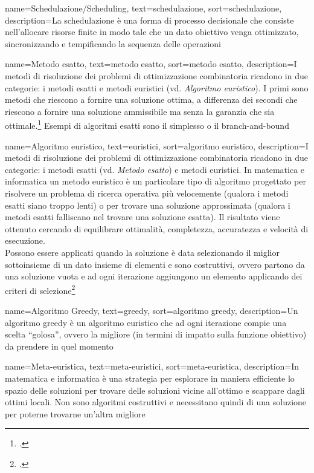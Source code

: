 {
    name=Schedulazione/Scheduling,
    text=schedulazione,
    sort=schedulazione,
    description={La schedulazione è una forma di processo decisionale che consiste nell'allocare risorse finite in modo tale che un dato obiettivo venga ottimizzato, sincronizzando e tempificando la sequenza delle operazioni}
}

{
    name=Metodo esatto,
    text=metodo esatto,
    sort=metodo esatto,
    description={I metodi di risoluzione dei problemi di ottimizzazione combinatoria ricadono in due categorie: i metodi esatti e metodi euristici (vd. \textit{Algoritmo euristico}). I primi sono metodi che riescono a fornire una soluzione ottima, a differenza dei secondi che riescono a fornire una soluzione ammissibile ma senza la garanzia che sia ottimale.\footcite{degio:dispensa}
    Esempi di algoritmi esatti sono il simplesso o il branch-and-bound}
}

{
    name=Algoritmo euristico,
    text=euristici,
    sort=algoritmo euristico,
    description={I metodi di risoluzione dei problemi di ottimizzazione combinatoria ricadono in due categorie: i metodi esatti (vd. \textit{Metodo esatto}) e metodi euristici. In matematica e informatica un metodo euristico è un particolare tipo di algoritmo progettato per risolvere un problema di ricerca operativa più velocemente (qualora i metodi esatti siano troppo lenti) o per trovare una soluzione approssimata (qualora i metodi esatti falliscano nel trovare una soluzione esatta). Il risultato viene ottenuto cercando di equilibrare ottimalità, completezza, accuratezza e velocità di esecuzione. \\
    Possono essere applicati quando la soluzione è data selezionando il miglior sottoinsieme di un dato insieme di elementi e sono costruttivi, ovvero partono da una soluzione vuota e ad ogni iterazione aggiungono un elemento applicando dei criteri di selezione\footcite{degio:dispensa}}
}

{
    name=Algoritmo Greedy,
    text=greedy,
    sort=algoritmo greedy,
    description={Un algoritmo greedy è un algoritmo euristico che ad ogni iterazione compie una scelta ``golosa'', ovvero la migliore (in termini di impatto sulla funzione obiettivo) da prendere in quel momento}
}

{
    name=Meta-euristica,
    text=meta-euristici,
    sort=meta-euristica,
    description={In matematica e informatica è una strategia per esplorare in maniera efficiente lo spazio delle soluzioni per trovare delle soluzioni vicine all'ottimo e scappare dagli ottimi locali. Non sono algoritmi costruttivi e necessitano quindi di una soluzione per poterne trovarne un'altra migliore}
}

